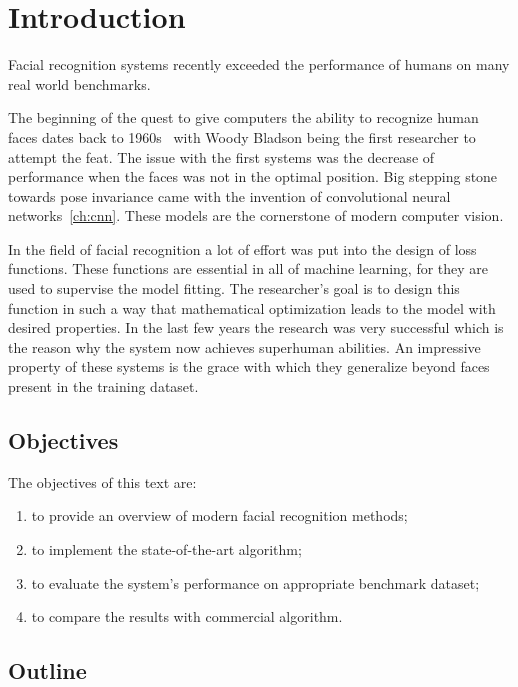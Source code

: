 \chapter{Introduction}\label{ch:introduction}
Facial recognition systems recently exceeded the performance of humans on many real world benchmarks.

The beginning of the quest to give computers the ability to recognize human faces dates back to 1960s~\cite{History}
with Woody Bladson being the first researcher to attempt the feat.
The issue with the first systems was the decrease of performance when the faces was not in the optimal position.
Big stepping stone towards pose invariance came with the invention of convolutional neural networks~\ref{ch:cnn}.
These models are the cornerstone of modern computer vision.

In the field of facial recognition a lot of effort was put into the design of loss functions.
These functions are essential in all of machine learning, for they are used to supervise the model fitting.
The researcher's goal is to design this function in such a way that mathematical optimization leads to the model
with desired properties.
In the last few years the research was very successful which is the reason why the system now achieves superhuman
abilities.
An impressive property of these systems is the grace with which they generalize beyond faces present in the training
dataset.

\section{Objectives}\label{sec:objectives}
The objectives of this text are:
\begin{enumerate}
    \item to provide an overview of modern facial recognition methods;
    \item to implement the state-of-the-art algorithm;
    \item to evaluate the system's performance on appropriate benchmark dataset;
    \item to compare the results with commercial algorithm.
\end{enumerate}

\section{Outline}\label{sec:outline}